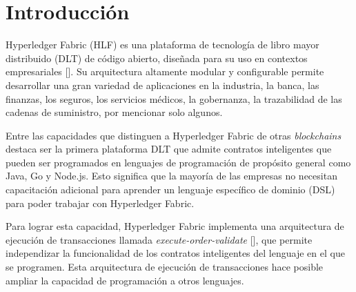\chapter*{Introducción}\label{chapter:introduction}

Hyperledger Fabric (HLF) es una plataforma de tecnología de libro mayor distribuido (DLT) de código abierto, diseñada para su uso en contextos empresariales [\cite{hlf-doc}]. Su arquitectura altamente modular y configurable permite desarrollar una gran variedad de aplicaciones en la industria, la banca, las finanzas, los seguros, los servicios médicos, la gobernanza, la trazabilidad de las cadenas de suministro, por mencionar solo algunos.

Entre las capacidades que distinguen a Hyperledger Fabric de otras \textit{blockchains} destaca ser la primera plataforma DLT que admite contratos inteligentes que pueden ser programados en lenguajes de programación de propósito general como Java, Go y Node.js. Esto significa que la mayoría de las empresas no necesitan capacitación adicional para aprender un lenguaje específico de dominio (DSL) para poder trabajar con Hyperledger Fabric.

Para lograr esta capacidad, Hyperledger Fabric implementa una arquitectura de ejecución de transacciones llamada \textit{execute-order-validate} [\cite{hlf-paper}], que permite independizar la funcionalidad de los contratos inteligentes del lenguaje en el que se programen. Esta arquitectura de ejecución de transacciones hace posible ampliar la capacidad de programación a otros lenguajes.




